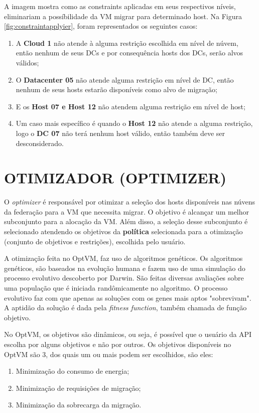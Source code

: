 A imagem mostra como as constraints aplicadas em seus respectivos níveis, eliminariam a possíbilidade
da VM migrar para determinado host. Na Figura \ref{fig:constraintapplyier}, foram representados os seguintes casos:

\begin{enumerate}
\item A \textbf{Cloud 1} não atende à alguma restrição escolhida em nível de núvem, então nenhum de seus DCs e por consequência hosts dos DCs, serão alvos válidos;
\item O \textbf{Datacenter 05} não atende alguma restrição em nível de DC, então nenhum de seus hosts estarão disponíveis como alvo de migração;
\item E os \textbf{Host 07 e Host 12} não atendem alguma restrição em nível de host;
\item Um caso mais específico é quando o \textbf{Host 12} não atende a alguma restrição, logo o \textbf{DC 07} não terá nenhum host válido, então também deve ser desconsiderado.
\end{enumerate}

\section{OTIMIZADOR (OPTIMIZER)}

O \textit{optimizer} é responsável por otimizar a seleção dos hosts disponíveis nas núvens da federação
para a VM que necessita migrar. O objetivo é alcançar um melhor subconjunto para a alocação da VM. 
Além disso, a seleção desse subconjunto é selecionado atendendo os objetivos da \textbf{política} 
selecionada para a otimização (conjunto de objetivos e restrições), escolhida pelo usuário.

A otimização feita no OptVM, faz uso de algoritmos genéticos. Os algoritmos genéticos,
são baseados na evolução humana e fazem uso de uma simulação do processo evolutivo descoberto por Darwin.
São feitas diversas avaliações sobre uma população que é iniciada randômicamente no algoritmo. O processo
evolutivo faz com que apenas as soluções com os genes mais aptos "sobrevivam". A aptidão da solução
é dada pela \textit{fitness function}, também chamada de função objetivo.

No OptVM, os objetivos são dinâmicos, ou seja, é possível que o usuário da API escolha por alguns
objetivos e não por outros. Os objetivos disponíveis no OptVM são 3, dos quais um ou mais podem ser 
escolhidos, são eles:

\begin{enumerate}
\item Minimização do consumo de energia;
\item Minimização de requisições de migração;
\item Minimização da sobrecarga da migração.
\end{enumerate}

